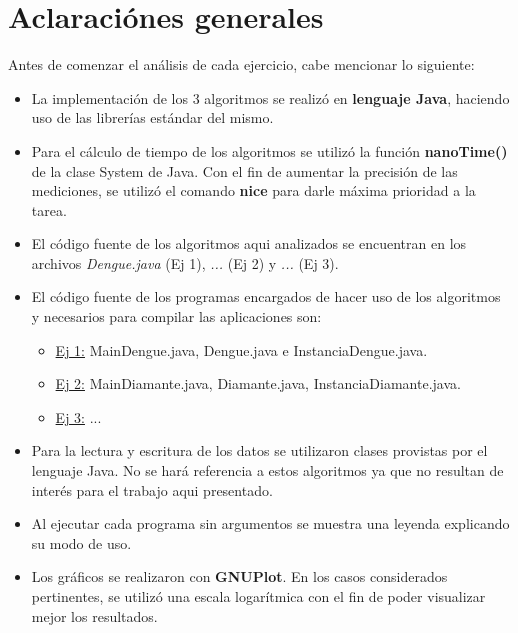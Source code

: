 \documentclass[a4paper,11pt] {article}
\begin{document}
\grupo{}

\maketitle

\bigskip
\section*{Aclaraci\'ones generales}

Antes de comenzar el an\'alisis de cada ejercicio, cabe mencionar lo siguiente:

\begin{itemize}
 \item La implementaci\'on de los 3 algoritmos se realiz\'o en \textbf{lenguaje Java}, haciendo uso de las librer\'ias est\'andar del mismo.
 \item Para el c\'alculo de tiempo de los algoritmos se utiliz\'o la funci\'on \textbf{nanoTime()} de la clase System de Java. Con el fin de aumentar la precisi\'on de las mediciones, se utiliz\'o el comando \textbf{nice} para darle m\'axima prioridad a la tarea.
 \item El c\'odigo fuente de los algoritmos aqui analizados se encuentran en los archivos \textit{Dengue.java} (Ej 1), \textit{...} (Ej 2) y \textit{...} (Ej 3).
 \item El c\'odigo fuente de los programas encargados de hacer uso de los algoritmos y necesarios para compilar las aplicaciones son:
 \begin{itemize}
    \item \underline{Ej 1:} MainDengue.java, Dengue.java e InstanciaDengue.java.
    \item \underline{Ej 2:} MainDiamante.java, Diamante.java, InstanciaDiamante.java.
    \item \underline{Ej 3:} ...
  \end{itemize}
 \item Para la lectura y escritura de los datos se utilizaron clases provistas por el lenguaje Java. No se har\'a referencia a estos algoritmos ya que no resultan de inter\'es para el trabajo aqui presentado.
 \item Al ejecutar cada programa sin argumentos se muestra una leyenda explicando su modo de uso.
 \item Los gr\'aficos se realizaron con \textbf{GNUPlot}. En los casos considerados pertinentes, se utiliz\'o una escala logar\'itmica con el fin de poder visualizar mejor los resultados.
\end{itemize}
\end{document}
